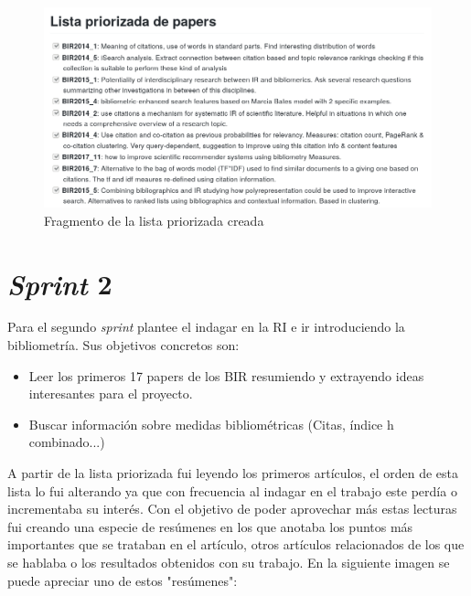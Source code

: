 \begin{figure}[ht]
	
	\centering
	\includegraphics[width=\linewidth]{imagenes/lista_priorizada}
	\caption{Fragmento de la lista priorizada creada}
\end{figure}

\section{\textit{Sprint} 2}
Para el segundo \textit{sprint} plantee el indagar en la \acrshort{RI} e ir introduciendo la bibliometría. Sus objetivos concretos son: 

\begin{itemize}
	\item Leer los primeros 17 papers de los \acrshort{BIR} resumiendo y extrayendo ideas interesantes para el proyecto.
	\item Buscar información sobre medidas bibliométricas (Citas, índice h combinado...)
\end{itemize}

A partir de la lista priorizada fui leyendo los primeros artículos, el orden de esta lista lo fui alterando ya que con frecuencia al indagar en el trabajo este perdía o incrementaba su interés. Con el objetivo de poder aprovechar más estas lecturas fui creando una especie de resúmenes en los que anotaba los puntos más importantes que se trataban en el artículo, otros artículos relacionados de los que se hablaba o los resultados obtenidos con su trabajo. En la siguiente imagen se puede apreciar uno de estos "resúmenes":

